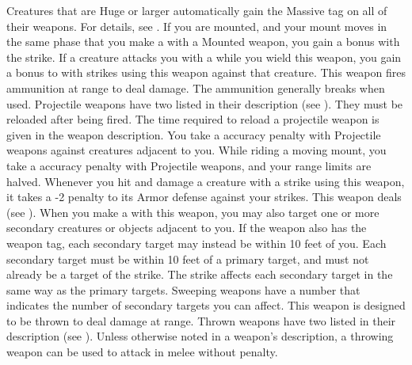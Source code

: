         Creatures that are Huge or larger automatically gain the Massive tag on all of their weapons.
        For details, see .
        \label{Mounted Weapon} If you are mounted, and your mount moves in the same phase that you make a  with a Mounted weapon, you gain a   bonus with the strike.
         If a creature attacks you with a   while you wield this weapon, you  gain a  bonus to  with strikes using this weapon against that creature.
         This weapon fires ammunition at range to deal damage.
        The ammunition generally breaks when used.
        Projectile weapons have two  listed in their description (see ).
        They must be reloaded after being fired.
        The time required to reload a projectile weapon is given in the weapon description.
        You take a  accuracy penalty with Projectile weapons against creatures adjacent to you.
        While riding a moving mount, you take a  accuracy penalty with Projectile weapons, and your range limits are halved.
         Whenever you hit and damage a creature with a strike using this weapon, it  takes a -2 penalty to its Armor defense against your strikes.
         This weapon deals  (see ).
        \label{Sweeping} When you make a   with this weapon, you may also target one or more secondary creatures or objects adjacent to you.
        If the weapon also has the  weapon tag, each secondary target may instead be within 10 feet of you.
        Each secondary target must be within 10 feet of a primary target, and must not already be a target of the strike.
        The strike affects each secondary target in the same way as the primary targets.
        Sweeping weapons have a number that indicates the number of secondary targets you can affect.
         This weapon is designed to be thrown to deal damage at range.
        Thrown weapons have two  listed in their description (see ).
        Unless otherwise noted in a weapon's description, a throwing weapon can be used to attack in melee without penalty.

